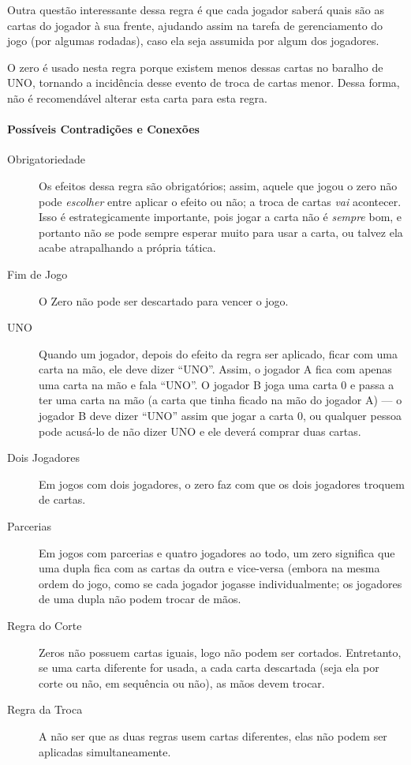 Outra questão interessante dessa regra é que cada jogador saberá quais são as cartas do jogador à sua frente, ajudando assim na tarefa de gerenciamento do jogo (por algumas rodadas), caso ela seja assumida por algum dos jogadores.

O zero é usado nesta regra porque existem menos dessas cartas no baralho de UNO, tornando a incidência desse evento de troca de cartas menor. Dessa forma, não é recomendável alterar esta carta para esta regra.

\paragraph{Possíveis Contradições e Conexões}

\begin{description}
\item[Obrigatoriedade]{Os efeitos dessa regra são obrigatórios; assim, aquele que jogou o zero não pode \emph{escolher} entre aplicar o efeito ou não; a troca de cartas \emph{vai} acontecer. Isso é estrategicamente importante, pois jogar a carta não é \textit{sempre} bom, e portanto não se pode sempre esperar muito para usar a carta, ou talvez ela acabe atrapalhando a própria tática.}
\item[Fim de Jogo]{O Zero não pode ser descartado para vencer o jogo.}
\item[UNO]{Quando um jogador, depois do efeito da regra ser aplicado, ficar com uma carta na mão, ele deve dizer ``UNO''. Assim, o jogador A fica com apenas uma carta na mão e fala ``UNO''. O jogador B joga uma carta 0 e passa a ter uma carta na mão (a carta que tinha ficado na mão do jogador A) --- o jogador B deve dizer ``UNO'' assim que jogar a carta 0, ou qualquer pessoa pode acusá-lo de não dizer UNO e ele deverá comprar duas cartas.}
\item[Dois Jogadores]{Em jogos com dois jogadores, o zero faz com que os dois jogadores troquem de cartas.}
\item[Parcerias]{Em jogos com parcerias e quatro jogadores ao todo, um zero significa que uma dupla fica com as cartas da outra e vice-versa (embora na mesma ordem do jogo, como se cada jogador jogasse individualmente; os jogadores de uma dupla não podem trocar de mãos.}
\item[Regra do Corte]{Zeros não possuem cartas iguais, logo não podem ser cortados. Entretanto, se uma carta diferente for usada, a cada carta descartada (seja ela por corte ou não, em sequência ou não), as mãos devem trocar.}
\item[Regra da Troca]{A não ser que as duas regras usem cartas diferentes, elas não podem ser aplicadas simultaneamente.}
\end{description}

